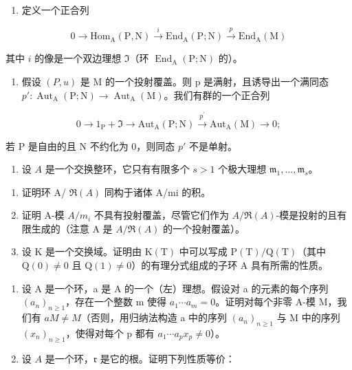 \begin{enumerate}
\def\labelenumi{\alph{enumi})}
\tightlist
\item
  定义一个正合列
\end{enumerate}

\[
0 \to \mathrm{Hom} _ {\mathrm{A}} (\mathrm{P}, \mathrm{N}) \xrightarrow {i} \mathrm{End} _ {\mathrm{A}} (\mathrm{P}; \mathrm{N}) \xrightarrow {p} \mathrm{End} _ {\mathrm{A}} (\mathrm{M})
\]

其中 \(i\) 的像是一个双边理想 \(\mathfrak{I}\)（环 \(\operatorname{End}_{\mathrm{A}}(\mathrm{P};\mathrm{N})\) 的）。

\begin{enumerate}
\def\labelenumi{\alph{enumi})}
\setcounter{enumi}{1}
\tightlist
\item
  假设 \((P, u)\) 是 M 的一个投射覆盖。则 p 是满射，且诱导出一个满同态 \(p' : \operatorname{Aut}_{\mathrm{A}}(\mathrm{P}; \mathrm{N}) \to \operatorname{Aut}_{\mathrm{A}}(\mathrm{M})\)。我们有群的一个正合列
\end{enumerate}

\[
0 \to 1 _ {\mathrm{P}} + \Im \to \mathrm{Aut} _ {\mathrm{A}} (\mathrm{P}; \mathrm{N}) \xrightarrow {p ^ {\prime}} \mathrm{Aut} _ {\mathrm{A}} (\mathrm{M}) \to 0;
\]

若 P 是自由的且 N 不约化为 0，则同态 \(p'\) 不是单射。

\begin{enumerate}
\def\labelenumi{\arabic{enumi})}
\setcounter{enumi}{21}
\tightlist
\item
  设 \(A\) 是一个交换整环，它只有有限多个 \(s > 1\) 个极大理想 \(\mathfrak{m}_1, \ldots, \mathfrak{m}_s\)。
\end{enumerate}

\begin{enumerate}
\def\labelenumi{\alph{enumi})}
\item
  证明环 A/ \(\Re(A)\) 同构于诸体 A/mi 的积。
\item
  证明 A-模 \(A/m_{i}\) 不具有投射覆盖，尽管它们作为 \(A/\Re(A)\)-模是投射的且有限生成的（注意 A 是 \(A/\Re(A)\) 的一个投射覆盖）。
\item
  设 K 是一个交换域。证明由 \(\mathrm{K(T)}\) 中可以写成 \(\mathrm{P(T)/Q(T)}\)（其中 \(\mathrm{Q(0) \neq 0}\) 且 \(\mathrm{Q(1) \neq 0}\)）的有理分式组成的子环 A 具有所需的性质。
\end{enumerate}

\begin{enumerate}
\def\labelenumi{\arabic{enumi})}
\setcounter{enumi}{22}
\item
  设 A 是一个环，a 是 A 的一个（左）理想。假设对 a 的元素的每个序列 \((a_{n})_{n\geqslant1}\)，存在一个整数 m 使得 \(a_{1}\cdots a_{m}=0\)。证明对每个非零 A-模 M，我们有 \(aM\neq M\)（否则，用归纳法构造 a 中的序列 \((a_{n})_{n\geqslant1}\) 与 M 中的序列 \((x_{n})_{n\geqslant1}\)，使得对每个 p 都有 \(a_{1}\cdots a_{p}x_{p}\neq0\)）。
\item
  设 \(A\) 是一个环，\(\mathfrak{r}\) 是它的根。证明下列性质等价：
\end{enumerate}


